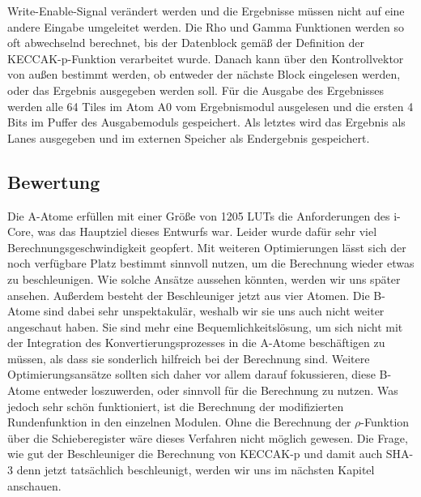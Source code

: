 Write-Enable-Signal verändert werden und die Ergebnisse müssen nicht auf eine andere Eingabe umgeleitet werden.
Die Rho und Gamma Funktionen werden so oft abwechselnd berechnet, bis der Datenblock gemäß der Definition der KECCAK-p-Funktion verarbeitet wurde.
Danach kann über den Kontrollvektor von außen bestimmt werden, ob entweder der nächste Block eingelesen werden, oder das Ergebnis ausgegeben werden soll.
Für die Ausgabe des Ergebnisses werden alle 64 Tiles im Atom A0 vom Ergebnismodul ausgelesen und die ersten 4 Bits im Puffer des Ausgabemoduls gespeichert.
Als letztes wird das Ergebnis als Lanes ausgegeben und im externen Speicher als Endergebnis gespeichert.

\subsection{Bewertung}
Die A-Atome erfüllen mit einer Größe von 1205 LUTs die Anforderungen des i-Core, was das Hauptziel dieses Entwurfs war.
Leider wurde dafür sehr viel Berechnungsgeschwindigkeit geopfert. Mit weiteren Optimierungen lässt sich der noch verfügbare Platz
bestimmt sinnvoll nutzen, um die Berechnung wieder etwas zu beschleunigen. Wie solche Ansätze aussehen könnten, werden wir uns später
ansehen. Außerdem besteht der Beschleuniger jetzt aus vier Atomen. Die B-Atome sind dabei sehr unspektakulär, weshalb wir sie uns auch
nicht weiter angeschaut haben. Sie sind mehr eine Bequemlichkeitslösung, um sich nicht mit der Integration des Konvertierungsprozesses
in die A-Atome beschäftigen zu müssen, als dass sie sonderlich hilfreich bei der Berechnung sind. Weitere Optimierungsansätze sollten
sich daher vor allem darauf fokussieren, diese B-Atome entweder loszuwerden, oder sinnvoll für die Berechnung zu nutzen.
Was jedoch sehr schön funktioniert, ist die Berechnung der modifizierten Rundenfunktion in den einzelnen Modulen.
Ohne die Berechnung der $\rho$-Funktion über die Schieberegister wäre dieses Verfahren nicht möglich gewesen.
Die Frage, wie gut der Beschleuniger die Berechnung von KECCAK-p und damit auch SHA-3 denn jetzt tatsächlich beschleunigt,
werden wir uns im nächsten Kapitel anschauen.